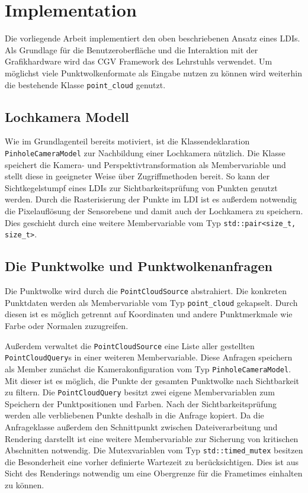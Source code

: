 \documentclass[hyperref, beleg, german]{cgvpub}
\begin{document}
\chapter{Implementation}

Die vorliegende Arbeit implementiert den oben beschriebenen Ansatz eines LDIs.
Als Grundlage für die Benutzeroberfläche und die Interaktion mit der
Grafikhardware wird das CGV Framework des Lehrstuhls verwendet. Um möglichst
viele Punktwolkenformate als Eingabe nutzen zu können wird weiterhin die
bestehende Klasse \texttt{point\_cloud} genutzt.

\section{Lochkamera Modell}

Wie im Grundlagenteil bereits motiviert, ist die Klassendeklaration
\texttt{PinholeCameraModel} zur Nachbildung einer Lochkamera nützlich. Die
Klasse speichert die Kamera- und Perspektivtransformation als Membervariable
und stellt diese in geeigneter Weise über Zugriffmethoden bereit. So kann der
Sichtkegelstumpf eines LDIs zur Sichtbarkeitsprüfung von Punkten genutzt
werden. Durch die Rasterisierung der Punkte im LDI ist es außerdem notwendig
die Pixelauflösung der Sensorebene und damit auch der Lochkamera zu speichern.
Dies geschieht durch eine weitere Membervariable vom Typ
\texttt{std::pair<size\_t, size\_t>}.

\section{Die Punktwolke und Punktwolkenanfragen}

Die Punktwolke wird durch die \texttt{PointCloudSource} abstrahiert. Die
konkreten Punktdaten werden als Membervariable vom Typ \texttt{point\_cloud}
gekapselt. Durch diesen ist es möglich getrennt auf Koordinaten und andere
Punktmerkmale wie Farbe oder Normalen zuzugreifen.

Außerdem verwaltet die \texttt{PointCloudSource} eine Liste aller gestellten
\texttt{PointCloudQuery}s in einer weiteren Membervariable. Diese Anfragen
speichern als Member zunächst die Kamerakonfiguration vom Typ
\texttt{PinholeCameraModel}. Mit dieser ist es möglich, die Punkte der gesamten
Punktwolke nach Sichtbarkeit zu filtern. Die \texttt{PointCloudQuery} besitzt
zwei eigene Membervariablen zum Speichern der Punktpositionen und Farben. Nach
der Sichtbarkeitsprüfung werden alle verbliebenen Punkte deshalb in die Anfrage
kopiert. Da die Anfrageklasse außerdem den Schnittpunkt zwischen
Dateiverarbeitung und Rendering darstellt ist eine weitere Membervariable zur
Sicherung von kritischen Abschnitten notwendig. Die Mutexvariablen vom Typ
\texttt{std::timed\_mutex} besitzen die Besonderheit eine vorher definierte
Wartezeit zu berücksichtigen. Dies ist aus Sicht des Renderings notwendig um
eine Obergrenze für die Frametimes einhalten zu können.
\end{document}

